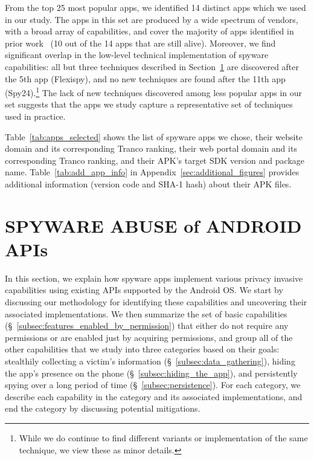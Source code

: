 \documentclass[sigconf,balance=false]{acmart}
\begin{document}
From the top 25 most popular apps, we identified 14 distinct apps which we used in our study. The apps in this set are produced by a wide spectrum of vendors, with a broad array of capabilities, and cover the majority of apps identified in prior work~\cite{chatterjee2018spyware} (10 out of the 14 apps that are still alive). Moreover, we find significant overlap in the low-level technical implementation of spyware capabilities:  all but three techniques described in Section~\ref{sec:api-abuse} are discovered after the 5th app (Flexispy), and no new techniques are found after the 11th app (Spy24).\footnote{While we do continue to find different variants or implementation of the same technique, we view these as minor details.}  The lack of new techniques discovered among less popular apps in our set suggests that the apps we study capture a representative set of techniques used in practice.


Table~\ref{tab:apps_selected} shows the list of spyware apps we chose, their website domain and its corresponding Tranco ranking, their web portal domain and its corresponding Tranco ranking, and their APK's target SDK version and package name. Table~\ref{tab:add_app_info} in Appendix~\ref{sec:additional_figures} provides additional information (version code and SHA-1 hash) about their APK files.




%

%

\section{SPYWARE ABUSE of ANDROID APIs}
\label{sec:api-abuse}

In this section, we explain how spyware apps implement various privacy invasive
capabilities using existing APIs supported by the Android OS.
We start by discussing our methodology for identifying these capabilities and uncovering their associated implementations.
We then summarize the set of basic capabilities (\S~\ref{subsec:features_enabled_by_permission}) that either do not require any permissions or are enabled just by acquiring permissions,
and group
all of the other capabilities that we study into three categories based on their goals: stealthily
collecting a victim's information (\S~\ref{subsec:data_gathering}), hiding the app's presence on the phone (\S~\ref{subsec:hiding_the_app}), and persistently
spying over a long period of time (\S~\ref{subsec:persistence}).
For each category, we
describe
each capability in the category and its associated implementations, and end
the category by discussing potential mitigations.
\end{document}

